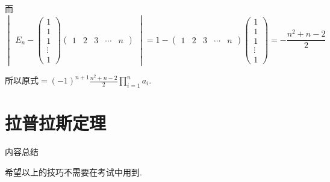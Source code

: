 \begin{solution}
    而 \[ \begin{vmatrix}E_n-\begin{pmatrix}
        1\\1\\1\\\vdots\\1
    \end{pmatrix}\begin{pmatrix}1 & 2 & 3 & \cdots & n\end{pmatrix}\end{vmatrix}
    =1-\begin{pmatrix}1 & 2 & 3 & \cdots & n\end{pmatrix}
        \begin{pmatrix}1 \\ 1 \\ 1 \\ \vdots \\ 1\end{pmatrix}
    =-\frac{n^2+n-2}{2} \]

    所以原式$\displaystyle =(-1)^{n+1}\frac{n^2+n-2}{2}\prod_{i=1}^na_i$.
\end{solution}

\section{拉普拉斯定理}

\centerline{\heiti \Large 内容总结}

希望以上的技巧不需要在考试中用到.

\vspace{2ex}

